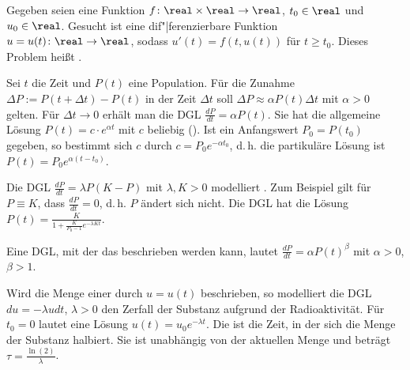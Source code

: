 \begin{Bem}
    Gegeben seien eine Funktion $f\colon \real \times \real \rightarrow \real$,
    $t_0 \in \real$ und $u_0 \in \real$.
    Gesucht ist eine dif"|ferenzierbare Funktion
    $u = u(t)\colon \real \rightarrow \real$, sodass
    $u'(t) = f(t, u(t))$ für $t \ge t_0$.
    Dieses Problem heißt .
\end{Bem}

\begin{Bsp}
    Sei $t$ die Zeit und $P(t)$ eine Population.
    Für die Zunahme $\Delta P := P(t + \Delta t) - P(t)$ in der Zeit $\Delta t$
    soll $\Delta P \approx \alpha P(t) \Delta t$ mit $\alpha > 0$ gelten.
    Für $\Delta t \to 0$ erhält man die DGL $\frac{dP}{dt} = \alpha P(t)$.
    Sie hat die allgemeine Lösung $P(t) = c \cdot e^{\alpha t}$ mit
    $c$ beliebig
    ().
    Ist ein Anfangswert $P_0 = P(t_0)$ gegeben, so bestimmt sich $c$ durch
    $c = P_0 e^{-\alpha t_0}$, d.\,h. die partikuläre Lösung ist
    $P(t) = P_0 e^{\alpha (t - t_0)}$.
\end{Bsp}

\begin{Bsp}
    Die DGL $\frac{dP}{dt} = \lambda P(K - P)$ mit $\lambda, K > 0$ modelliert
    .
    Zum Beispiel gilt für $P \equiv K$, dass $\frac{dP}{dt} = 0$,
    d.\,h. $P$ ändert sich nicht.
    Die DGL hat die Lösung
    $P(t) = \frac{K}{1 + \frac{K}{P_0 - 1} e^{-\lambda K t}}$.
\end{Bsp}

\begin{Bsp}
    Eine DGL, mit der das 
    beschrieben werden kann, lautet $\frac{dP}{dt} = \alpha P(t)^\beta$ mit
    $\alpha > 0$, $\beta > 1$.
\end{Bsp}

\begin{Bsp}
    Wird die Menge einer 
    durch $u = u(t)$ beschrieben,
    so modelliert die DGL $du = -\lambda u dt$, $\lambda > 0$ den Zerfall
    der Substanz aufgrund der Radioaktivität.
    Für $t_0 = 0$ lautet eine Lösung $u(t) = u_0 e^{-\lambda t}$.
    Die  ist die Zeit, in der sich die Menge der
    Substanz halbiert.
    Sie ist unabhängig von der aktuellen Menge und beträgt
    $\tau = \frac{\ln(2)}{\lambda}$.
\end{Bsp}

\pagebreak

